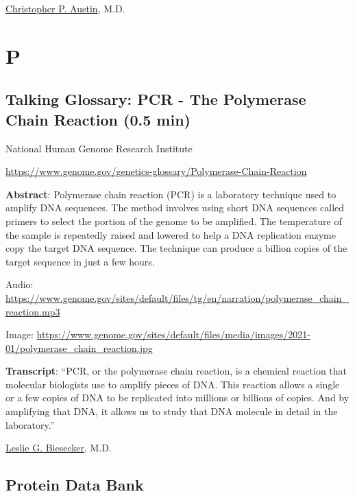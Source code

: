 \documentclass[
]{book}
\begin{document}
\href{https://www.nih.gov/about-nih/who-we-are/nih-director/statements/nih-statement-departure-dr-christopher-austin}{Christopher P. Austin}, M.D.

\hypertarget{p}{%
\chapter{P}\label{p}}

\hypertarget{talking-glossary-pcr---the-polymerase-chain-reaction-0.5-min}{%
\section{Talking Glossary: PCR - The Polymerase Chain Reaction (0.5 min)}\label{talking-glossary-pcr---the-polymerase-chain-reaction-0.5-min}}

National Human Genome Research Institute

\url{https://www.genome.gov/genetics-glossary/Polymerase-Chain-Reaction}

\textbf{Abstract}: Polymerase chain reaction (PCR) is a laboratory technique used to amplify DNA sequences. The method involves using short DNA sequences called primers to select the portion of the genome to be amplified. The temperature of the sample is repeatedly raised and lowered to help a DNA replication enzyme copy the target DNA sequence. The technique can produce a billion copies of the target sequence in just a few hours.

Audio: \url{https://www.genome.gov/sites/default/files/tg/en/narration/polymerase_chain_reaction.mp3}

Image: \url{https://www.genome.gov/sites/default/files/media/images/2021-01/polymerase_chain_reaction.jpg}

\textbf{Transcript}: ``PCR, or the polymerase chain reaction, is a chemical reaction that molecular biologists use to amplify pieces of DNA. This reaction allows a single or a few copies of DNA to be replicated into millions or billions of copies. And by amplifying that DNA, it allows us to study that DNA molecule in detail in the laboratory.''

\href{https://www.genome.gov/staff/Leslie-G-Biesecker-MD}{Leslie G. Biesecker}, M.D.

\hypertarget{protein-data-bank}{%
\section{Protein Data Bank}\label{protein-data-bank}}
\end{document}

